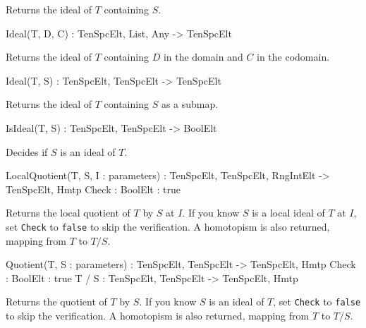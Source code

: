 Returns the ideal of $T$ containing $S$.

\begin{intrinsics}
Ideal(T, D, C) : TenSpcElt, List, Any -> TenSpcElt
\end{intrinsics}

Returns the ideal of $T$ containing $D$ in the domain and $C$ in the codomain.

\begin{intrinsics}
Ideal(T, S) : TenSpcElt, TenSpcElt -> TenSpcElt
\end{intrinsics}

Returns the ideal of $T$ containing $S$ as a submap.

\begin{intrinsics}
IsIdeal(T, S) : TenSpcElt, TenSpcElt -> BoolElt
\end{intrinsics}

Decides if $S$ is an ideal of $T$.

\begin{intrinsics}
LocalQuotient(T, S, I : parameters) : TenSpcElt, TenSpcElt, {RngIntElt} -> TenSpcElt, Hmtp
    Check : BoolElt : true
\end{intrinsics}

Returns the local quotient of $T$ by $S$ at $I$. If you know $S$ is a local 
ideal of $T$ at $I$, set {\tt Check} to {\tt false} to skip the verification.
A homotopism is also returned, mapping from $T$ to $T/S$.

\begin{intrinsics}
Quotient(T, S : parameters) : TenSpcElt, TenSpcElt -> TenSpcElt, Hmtp
    Check : BoolElt : true
T / S : TenSpcElt, TenSpcElt -> TenSpcElt, Hmtp
\end{intrinsics}

Returns the quotient of $T$ by $S$. If you know $S$ is an ideal of $T$, 
set {\tt Check} to {\tt false} to skip the verification.
A homotopism is also returned, mapping from $T$ to $T/S$.


